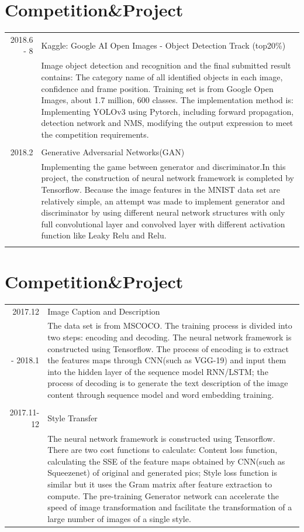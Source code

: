 \documentclass[a4paper,11pt]{article}
\begin{document}
\section{Competition\&Project}
\begin{tabular}{r|p{11cm}}
\textsc{2018.6 - 8} & Kaggle: Google AI Open Images - Object Detection Track (top20\%)\\&\footnotesize{Image object detection and recognition and the final submitted result contains: The category name of all identified objects in each image, confidence and frame position. Training set is from Google Open Images, about 1.7 million, 600 classes. The implementation method is: Implementing YOLOv3 using Pytorch, including forward propagation, detection network and NMS, modifying the output expression to meet the competition requirements.}\\\multicolumn{2}{c}{} \\
\textsc{2018.2} & Generative Adversarial Networks(GAN)\\&\footnotesize{Implementing the game between generator and discriminator.In this project, the construction of neural network framework is completed by Tensorflow. Because the image features in the MNIST data set are relatively simple, an attempt was made to implement generator and discriminator by using different neural network structures with only full convolutional layer and convolved layer with different activation function like Leaky Relu and Relu.}\\\multicolumn{2}{c}{} \\
\end{tabular}

\section{Competition\&Project}
\begin{tabular}{r|p{11cm}}
\textsc{2017.12} & Image Caption and Description\\{- 2018.1}&\footnotesize{The data set is from MSCOCO. The training process is divided into two steps: encoding and decoding. The neural network framework is constructed using Tensorflow. The process of encoding is to extract the features maps through CNN(such as VGG-19) and input them into the hidden layer of the sequence model RNN/LSTM; the process of decoding is to generate the text description of the image content through sequence model and word embedding training.  }\\\multicolumn{2}{c}{} \\
\textsc{2017.11-12} & Style Transfer\\&\footnotesize{The neural network framework is constructed using Tensorflow. There are two cost functions to calculate: Content loss function, calculating the SSE of the feature maps obtained by CNN(such as Squeezenet) of original and generated pics; Style loss function is similar but it uses the Gram matrix after feature extraction to compute. The pre-training Generator network can accelerate the speed of image transformation and facilitate the transformation of a large number of images of a single style. }
\end{tabular}
\end{document}
